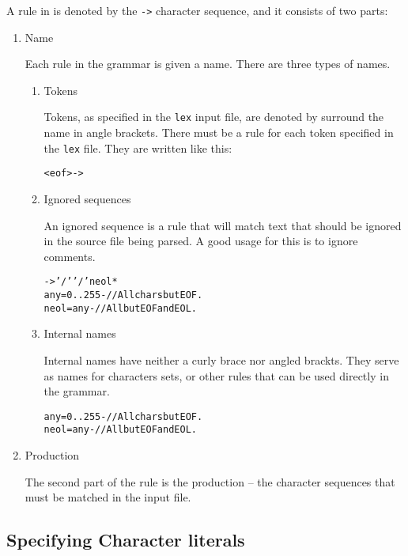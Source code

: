 A rule in \dfagrm is denoted by the \texttt{->} character sequence, and
it consists of two parts:
\begin{enumerate}
\item Name

  Each rule in the grammar is given a name.  There are three types of
  names.
  \begin{enumerate}
  \item Tokens

    Tokens, as specified in the \texttt{lex} input file, are denoted
    by surround the name in angle brackets.  There must be a rule for
    each token specified in the \texttt{lex} file.  They are written
    like this:
    \begin{alltt}
      <eof>    -> 
    \end{alltt}

  \item Ignored sequences

    An ignored sequence is a rule that will match text that should be
    ignored in the source file being parsed.  A good usage for this
    is to ignore comments.

    \begin{alltt}
       -> '/' '/' neol*
      any           = 0..255 -    // All chars but EOF.
      neol          = any -       // All but EOF and EOL.
    \end{alltt}

  \item Internal names

    Internal names have neither a curly brace nor angled brackts.
    They serve as names for characters sets, or other rules that can
    be used directly in the grammar.

    \begin{alltt}
      any   = 0..255 -    // All chars but EOF.
      neol  = any -       // All but EOF and EOL.
    \end{alltt}

  \end{enumerate}

\item Production

  The second part of the rule is the production -- the character
  sequences that must be matched in the input file.
\end{enumerate}

\subsection{Specifying Character literals}

